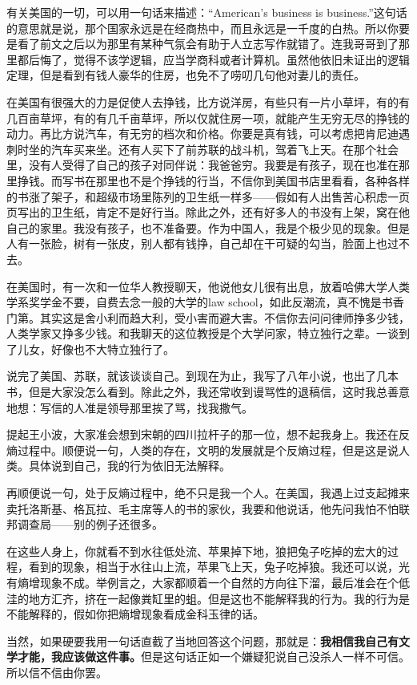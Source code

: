 \documentclass[fontset=fandol,12pt,a5paper]{ctexbook}
\begin{document}
有关美国的一切，可以用一句话来描述：“American's business is business.”这句话的意思就是说，那个国家永远是在经商热中，而且永远是一千度的白热。所以你要是看了前文之后以为那里有某种气氛会有助于人立志写作就错了。连我哥哥到了那里都后悔了，觉得不该学逻辑，应当学商科或者计算机。虽然他依旧未证出的逻辑定理，但是看到有钱人豪华的住房，也免不了唠叨几句他对妻儿的责任。

在美国有很强大的力是促使人去挣钱，比方说洋房，有些只有一片小草坪，有的有几百亩草坪，有的有几千亩草坪，所以仅就住房一项，就能产生无穷无尽的挣钱的动力。再比方说汽车，有无穷的档次和价格。你要是真有钱，可以考虑把肯尼迪遇刺时坐的汽车买来坐。还有人买下了前苏联的战斗机，驾着飞上天。在那个社会里，没有人受得了自己的孩子对同伴说：我爸爸穷。我要是有孩子，现在也准在那里挣钱。而写书在那里也不是个挣钱的行当，不信你到美国书店里看看，各种各样的书涨了架子，和超级市场里陈列的卫生纸一样多——假如有人出售苦心积虑一页页写出的卫生纸，肯定不是好行当。除此之外，还有好多人的书没有上架，窝在他自己的家里。我没有孩子，也不准备要。作为中国人，我是个极少见的现象。但是人有一张脸，树有一张皮，别人都有钱挣，自己却在干可疑的勾当，脸面上也过不去。

在美国时，有一次和一位华人教授聊天，他说他女儿很有出息，放着哈佛大学人类学系奖学金不要，自费去念一般的大学的law school，如此反潮流，真不愧是书香门第。其实这是舍小利而趋大利，受小害而避大害。不信你去问问律师挣多少钱，人类学家又挣多少钱。和我聊天的这位教授是个大学问家，特立独行之辈。一谈到了儿女，好像也不大特立独行了。

说完了美国、苏联，就该谈谈自己。到现在为止，我写了八年小说，也出了几本书，但是大家没怎么看到。除此之外，我还常收到谩骂性的退稿信，这时我总善意地想：写信的人准是领导那里挨了骂，找我撒气。

提起王小波，大家准会想到宋朝的四川拉杆子的那一位，想不起我身上。我还在反熵过程中。顺便说一句，人类的存在，文明的发展就是个反熵过程，但是这是说人类。具体说到自己，我的行为依旧无法解释。

再顺便说一句，处于反熵过程中，绝不只是我一个人。在美国，我遇上过支起摊来卖托洛斯基、格瓦拉、毛主席等人的书的家伙，我要和他说话，他先问我怕不怕联邦调查局——别的例子还很多。

在这些人身上，你就看不到水往低处流、苹果掉下地，狼把兔子吃掉的宏大的过程，看到的现象，相当于水往山上流，苹果飞上天，兔子吃掉狼。我还可以说，光有熵增现象不成。举例言之，大家都顺着一个自然的方向往下溜，最后准会在个低洼的地方汇齐，挤在一起像粪缸里的蛆。但是这也不能解释我的行为。我的行为是不能解释的，假如你把熵增现象看成金科玉律的话。

当然，如果硬要我用一句话直截了当地回答这个问题，那就是：\textbf{我相信我自己有文学才能，我应该做这件事。}但是这句话正如一个嫌疑犯说自己没杀人一样不可信。所以信不信由你罢。
\end{document}
